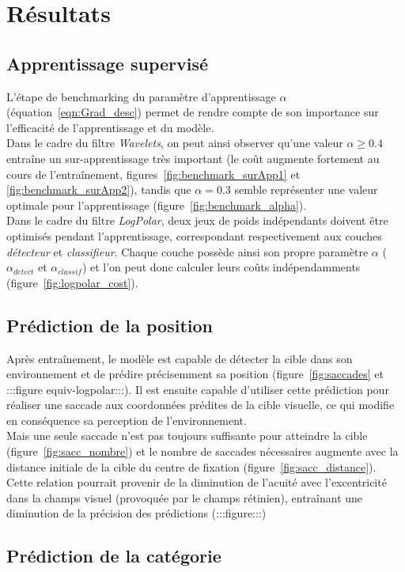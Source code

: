 
\chapter{Résultats} %
 
\label{Résultats} %


\section{Apprentissage supervisé}

L'étape de benchmarking du paramètre d'apprentissage $\alpha$ (équation~\ref{eqn:Grad_desc}) permet de rendre compte de son importance sur l'efficacité de l'apprentissage et du modèle. \\
Dans le cadre du filtre \textit{Wavelets}, on peut ainsi observer qu'une valeur $\alpha\geq0.4$ entraîne un sur-apprentissage très important (le coût augmente fortement au cours de l'entraînement, figures~\ref{fig:benchmark_surApp1} et \ref{fig:benchmark_surApp2}), tandis que $\alpha=0.3$ semble représenter une valeur optimale pour l'apprentissage (figure~\ref{fig:benchmark_alpha}).\\
Dans le cadre du filtre \textit{LogPolar}, deux jeux de poids indépendants doivent être optimisés pendant l'apprentissage,  correspondant respectivement aux couches \textit{détecteur} et \textit{classifieur}. Chaque couche possède ainsi son propre paramètre $\alpha$ ($\alpha_{detect}$ et $\alpha_{classif}$) et l'on peut donc calculer leurs coûts indépendamments (figure~\ref{fig:logpolar_cost}).


\section{Prédiction de la position}

Après entraînement, le modèle est capable de détecter la cible dans son environnement et de prédire précisemment sa position (figure~\ref{fig:saccades} et :::figure equiv-logpolar:::). Il est ensuite capable d'utiliser cette prédiction pour réaliser une saccade aux coordonnées prédites de la cible visuelle, ce qui modifie en conséquence sa perception de l'environnement.\\
Mais une seule saccade n'est pas toujours suffisante pour atteindre la cible (figure~\ref{fig:sacc_nombre}) et le nombre de saccades nécessaires augmente avec la distance initiale de la cible du centre de fixation (figure~\ref{fig:sacc_distance}). Cette relation pourrait provenir de la diminution de l'acuité avec l'excentricité dans la champs visuel (provoquée par le champs rétinien), entraînant une diminution de la précision des prédictions (:::figure:::)


\section{Prédiction de la catégorie}

